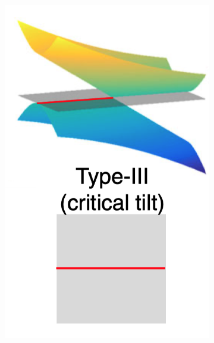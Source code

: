 \begin{figure}[H]
\begin{subfigure}[b]{0.2\linewidth}
            \includegraphics[width = \linewidth]{fig/Chap 2/Type III.png}
            \caption{}
            \label{2fig:type3}
        \end{subfigure}
        \begin{subfigure}[b]{0.2\linewidth}

\end{subfigure}
\end{figure}
